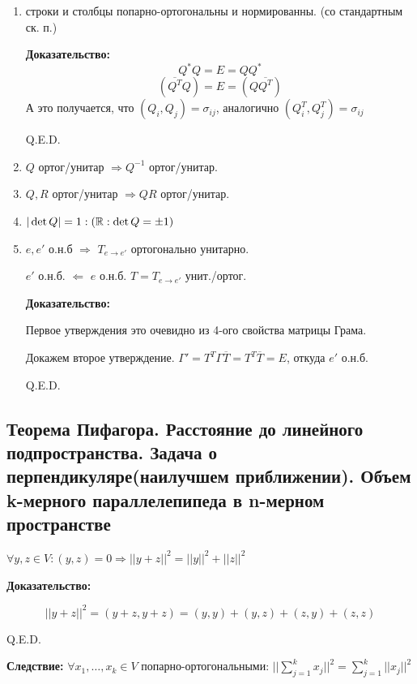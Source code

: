 \begin{enumerate}
    \item строки и столбцы попарно-ортогональны и нормированны. (со стандартным  ск. п.)

\textbf{Доказательство:}
    $$Q^* Q = E = Q Q^*$$
    $$(\overline{Q^T} Q ) =E = (Q \overline{Q^T})$$
    А это получается, что $(Q_i,Q_j) = \sigma_{ij}$, аналогично $(Q_i^T,Q_j^T) = \sigma_{ij}$

    \hfill Q.E.D.

    \item $Q$ ортог/унитар $\Rightarrow Q^{-1}$ ортог/унитар.

    \item $Q,R$ ортог/унитар $\Rightarrow QR$ ортог/унитар.
    \item $|\det Q | = 1 :(\mathbb{R}: \det Q = \pm 1 )$
    \item $e,e'$ о.н.б $\Rightarrow$ $T_{e\rightarrow e'}$ ортогонально унитарно. 
    
    $e'$ о.н.б. $\Leftarrow$ $e$ о.н.б. $T = T_{e \rightarrow e'}$ унит./ортог.\textbf{}

    \textbf{Доказательство:}

    Первое утверждения это очевидно из 4-ого свойства матрицы Грама.

    Докажем второе утверждение. $\Gamma' = T^T \Gamma \overline{T} = T^T \overline{T} = E$, откуда $e'$ о.н.б.    

    \hfill Q.E.D.


\end{enumerate}

\pagebreak
\subsection{Теорема Пифагора. Расстояние до линейного подпространства. Задача о перпендикуляре(наилучшем приближении). Объем k-мерного параллелепипеда в n-мерном пространстве}


$\forall y,z \in V: (y,z) = 0 \Rightarrow ||y+z||^2 = ||y||^2 + ||z||^2$

\textbf{Доказательство:}

$$||y+z||^2 = (y+z,y+z) = (y,y) + (y,z) + (z,y) + (z,z)$$

\hfill Q.E.D.

\textbf{Следствие:} $\forall x_1,\ldots ,x_k \in V$ попарно-ортогональными: $||\sum\limits_{j=1}^k x_j||^2 = \sum\limits_{j=1}^k||x_j||^2$


